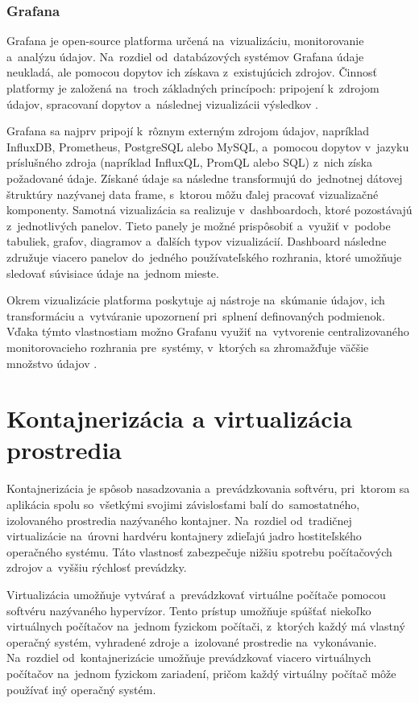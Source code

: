 \subsubsection{Grafana}
Grafana je open-source platforma určená na~vizualizáciu, monitorovanie a~analýzu 
údajov. Na~rozdiel od~databázových systémov Grafana údaje neukladá, ale pomocou 
dopytov ich získava z~existujúcich zdrojov. Činnosť platformy je založená 
na~troch základných princípoch: pripojení k~zdrojom údajov, spracovaní dopytov 
a~následnej vizualizácii výsledkov \cite{grafana}. 

Grafana sa najprv pripojí k~rôznym externým zdrojom údajov, napríklad InfluxDB, 
Prometheus, PostgreSQL alebo MySQL, a~pomocou dopytov v~jazyku príslušného 
zdroja (napríklad InfluxQL, PromQL alebo SQL) z~nich získa požadované údaje. 
Získané údaje sa následne transformujú do~jednotnej dátovej štruktúry nazývanej 
data frame, s~ktorou môžu ďalej pracovať vizualizačné komponenty. 
Samotná vizualizácia sa realizuje v~dashboardoch, ktoré pozostávajú z~jednotlivých 
panelov. Tieto panely je možné prispôsobiť a~využiť v~podobe tabuliek, grafov, 
diagramov a~ďalších typov vizualizácií. Dashboard následne združuje viacero panelov 
do~jedného používateľského rozhrania, ktoré umožňuje sledovať súvisiace údaje 
na~jednom mieste.

Okrem vizualizácie platforma poskytuje aj nástroje na~skúmanie údajov, ich 
transformáciu a~vytváranie upozornení pri~splnení definovaných podmienok. 
Vďaka týmto vlastnostiam možno Grafanu využiť na~vytvorenie centralizovaného 
monitorovacieho rozhrania pre~systémy, v~ktorých sa zhromažďuje väčšie množstvo 
údajov \cite{grafana_datasource}.

\section{Kontajnerizácia a virtualizácia prostredia}
Kontajnerizácia je spôsob nasadzovania a~prevádzkovania softvéru, pri~ktorom 
sa aplikácia spolu so~všetkými svojimi závislosťami balí do~samostatného, 
izolovaného prostredia nazývaného kontajner. Na~rozdiel od~tradičnej 
virtualizácie na~úrovni hardvéru kontajnery zdieľajú jadro hostiteľského 
operačného systému. Táto vlastnosť zabezpečuje nižšiu spotrebu 
počítačových zdrojov a~vyššiu rýchlosť prevádzky.

Virtualizácia umožňuje vytvárať a~prevádzkovať virtuálne počítače pomocou softvéru 
nazývaného hypervízor. Tento prístup umožňuje spúšťať niekoľko virtuálnych 
počítačov na~jednom fyzickom počítači, z~ktorých každý má vlastný operačný systém, 
vyhradené zdroje a~izolované prostredie na~vykonávanie. Na~rozdiel od~kontajnerizácie 
umožňuje prevádzkovať viacero virtuálnych počítačov na~jednom fyzickom zariadení, 
pričom každý virtuálny počítač môže používať iný operačný systém.

